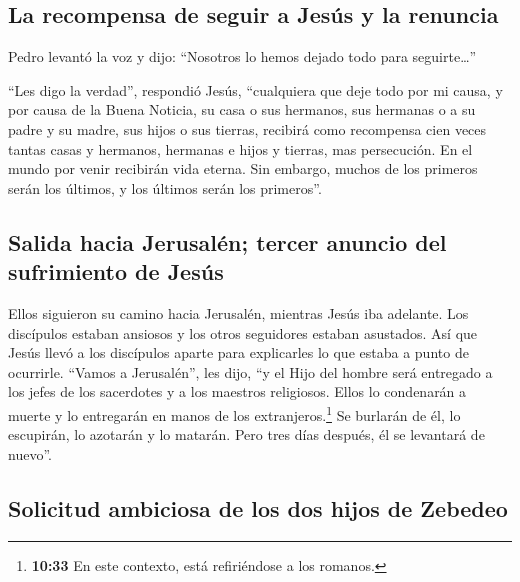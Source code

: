 \hypertarget{la-recompensa-de-seguir-a-jesuxfas-y-la-renuncia}{%
\subsection{La recompensa de seguir a Jesús y la
renuncia}\label{la-recompensa-de-seguir-a-jesuxfas-y-la-renuncia}}

 Pedro levantó la voz y dijo: ``Nosotros lo hemos dejado
todo para seguirte\ldots{}''

 ``Les digo la verdad'', respondió Jesús, ``cualquiera
que deje todo por mi causa, y por causa de la Buena Noticia, su casa o
sus hermanos, sus hermanas o a su padre y su madre, sus hijos o sus
tierras,  recibirá como recompensa cien veces tantas
casas y hermanos, hermanas e hijos y tierras, mas persecución. En el
mundo por venir recibirán vida eterna.  Sin embargo,
muchos de los primeros serán los últimos, y los últimos serán los
primeros''.

\hypertarget{salida-hacia-jerusaluxe9n-tercer-anuncio-del-sufrimiento-de-jesuxfas}{%
\subsection{Salida hacia Jerusalén; tercer anuncio del sufrimiento de
Jesús}\label{salida-hacia-jerusaluxe9n-tercer-anuncio-del-sufrimiento-de-jesuxfas}}

 Ellos siguieron su camino hacia Jerusalén, mientras
Jesús iba adelante. Los discípulos estaban ansiosos y los otros
seguidores estaban asustados. Así que Jesús llevó a los discípulos
aparte para explicarles lo que estaba a punto de ocurrirle.
 ``Vamos a Jerusalén'', les dijo, ``y el Hijo del hombre
será entregado a los jefes de los sacerdotes y a los maestros
religiosos. Ellos lo condenarán a muerte y lo entregarán en manos de los
extranjeros.\footnote{\textbf{10:33} En este contexto, está refiriéndose
  a los romanos.}  Se burlarán de él, lo escupirán, lo
azotarán y lo matarán. Pero tres días después, él se levantará de
nuevo''.

\hypertarget{solicitud-ambiciosa-de-los-dos-hijos-de-zebedeo}{%
\subsection{Solicitud ambiciosa de los dos hijos de
Zebedeo}\label{solicitud-ambiciosa-de-los-dos-hijos-de-zebedeo}}

